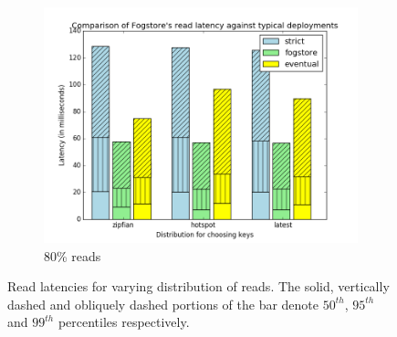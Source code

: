 \begin{figure}[t]
\begin{subfigure}[b]{0.32\linewidth}
    \includegraphics[width=\linewidth]{figures/fogstore/evals/stress-tests/0.8/read.png}
    \caption{80\% reads}
  \end{subfigure}
  \caption{Read latencies for varying distribution of reads. The solid, vertically dashed and obliquely dashed portions of the bar denote $50^{th}$, $95^{th}$ and $99^{th}$ percentiles respectively.}
  \label{fig:read-latencies}
\end{figure}

